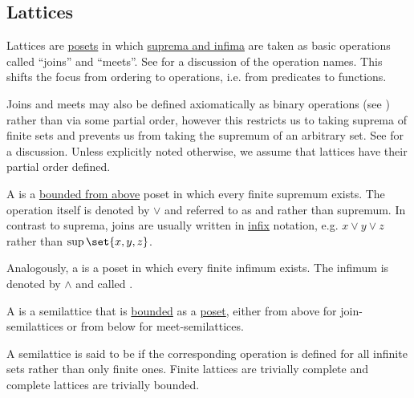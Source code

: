 \subsection{Lattices}\label{subsec:lattices}

\begin{definition}\label{def:semilattice}
  Lattices are \hyperref[def:poset]{posets} in which \hyperref[def:preordered_set/supremum_and_infimum]{suprema and infima} are taken as basic operations called \enquote{joins} and \enquote{meets}. See  for a discussion of the operation names. This shifts the focus from ordering to operations, i.e. from predicates to functions.

  Joins and meets may also be defined axiomatically as binary operations (see ) rather than via some partial order, however this restricts us to taking suprema of finite sets and prevents us from taking the supremum of an arbitrary set. See  for a discussion. Unless explicitly noted otherwise, we assume that lattices have their partial order defined.

  \begin{thmenum}[series=def:semilattice]
     A  is a \hyperref[def:poset_extremal_points/upper_and_lower_bounds]{bounded from above} poset in which every finite supremum exists. The operation itself is denoted by \( \vee \) and referred to as  and rather than supremum. In contrast to suprema, joins are usually written in \hyperref[rem:first_order_formula_conventions/infix]{infix} notation, e.g. \( x \vee y \vee z \) rather than \( \sup\set{ x, y, z } \).

     Analogously, a  is a poset in which every finite infimum exists. The infimum is denoted by \( \wedge \) and called .

     A  is a semilattice that is \hyperref[def:poset_extremal_points/top_and_bottom]{bounded} as a \hyperref[def:poset]{poset}, either from above for join-semilattices or from below for meet-semilattices.

     A semilattice is said to be  if the corresponding operation is defined for all infinite sets rather than only finite ones. Finite lattices are trivially complete and complete lattices are trivially bounded.


\end{thmenum}
\end{definition}
